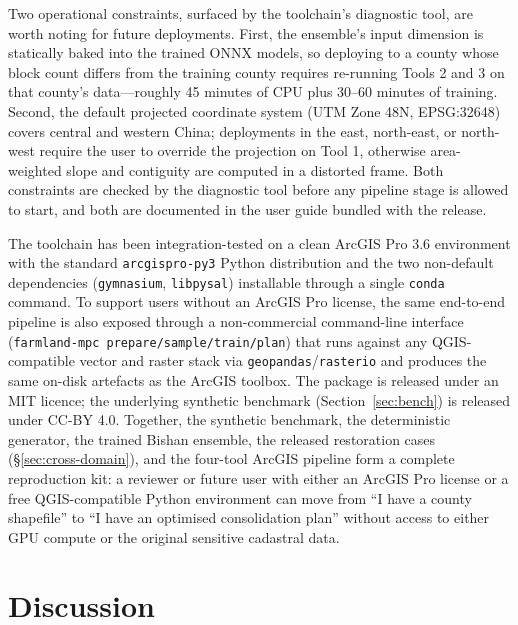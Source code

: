 \documentclass[11pt]{article}
\begin{document}
Two operational constraints, surfaced by the toolchain's diagnostic tool, are worth noting for future deployments. First, the ensemble's input dimension is statically baked into the trained ONNX models, so deploying to a county whose block count differs from the training county requires re-running Tools 2 and 3 on that county's data---roughly 45 minutes of CPU plus 30--60 minutes of training. Second, the default projected coordinate system (UTM Zone 48N, EPSG:32648) covers central and western China; deployments in the east, north-east, or north-west require the user to override the projection on Tool 1, otherwise area-weighted slope and contiguity are computed in a distorted frame. Both constraints are checked by the diagnostic tool before any pipeline stage is allowed to start, and both are documented in the user guide bundled with the release.

The toolchain has been integration-tested on a clean ArcGIS Pro 3.6 environment with the standard \texttt{arcgispro-py3} Python distribution and the two non-default dependencies (\texttt{gymnasium}, \texttt{libpysal}) installable through a single \texttt{conda} command. To support users without an ArcGIS Pro license, the same end-to-end pipeline is also exposed through a non-commercial command-line interface (\texttt{farmland-mpc prepare/sample/train/plan}) that runs against any QGIS-compatible vector and raster stack via \texttt{geopandas}/\texttt{rasterio} and produces the same on-disk artefacts as the ArcGIS toolbox. The package is released under an MIT licence; the underlying synthetic benchmark (Section~\ref{sec:bench}) is released under CC-BY 4.0. Together, the synthetic benchmark, the deterministic generator, the trained Bishan ensemble, the released restoration cases (\S\ref{sec:cross-domain}), and the four-tool ArcGIS pipeline form a complete reproduction kit: a reviewer or future user with either an ArcGIS Pro license or a free QGIS-compatible Python environment can move from ``I have a county shapefile'' to ``I have an optimised consolidation plan'' without access to either GPU compute or the original sensitive cadastral data.

\section{Discussion}\label{sec:discussion}
\end{document}
